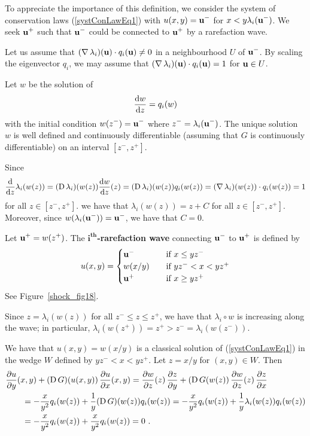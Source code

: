 \begin{egg}
To appreciate the importance of this definition,     \label{eggRareWaveN}
we consider the system of conservation laws
(\ref{systConLawEq1}) with $\displaystyle u(x,y) = \VEC{u}^-$
for $\displaystyle x < y \lambda_i(\VEC{u}^-)$.  We seek
$\displaystyle \VEC{u}^+$ such that $\displaystyle \VEC{u}^-$
could be connected to $\displaystyle \VEC{u}^+$ by
a rarefaction wave.

Let us assume that $(\graD \lambda_i)(\VEC{u}) \cdot q_i(\VEC{u}) \neq 0$
in a neighbourhood $U$ of $\displaystyle \VEC{u}^-$.  By scaling the
eigenvector $q_i$, we may assume that
$(\graD \lambda_i)(\VEC{u}) \cdot q_i(\VEC{u}) = 1$
for $\VEC{u} \in U$.

Let $w$ be the solution of
\[
\dydx{w}{z} = q_i(w)
\]
with the initial condition $\displaystyle w(z^-) = \VEC{u}^-$
where $\displaystyle z^- = \lambda_i(\VEC{u}^-)$.  The unique solution
$w$ is well defined and continuously differentiable (assuming that $G$
is continuously differentiable) on an interval $\displaystyle [z^-,z^+]$.

Since
\[
\dfdx{\lambda_i(w(z))}{z}  
= (\diff \lambda_i)(w(z)) \dydx{w}{z}(z)
= (\diff \lambda_i)(w(z)) q_i(w(z))
= (\graD \lambda_i)(w(z))\cdot q_i(w(z)) = 1
\]
for all $\displaystyle z \in [z^-,z^+]$. we have that
$\lambda_i(w(z)) = z + C$ for all $\displaystyle z \in [z^-,z^+]$.
Moreover, since $\displaystyle w(\lambda_i(\VEC{u}^-)) = \VEC{u}^-$,
we have that $C=0$.

Let $\displaystyle \VEC{u}^+ = w(z^+)$.
The {\bfseries $\displaystyle \mathbf{i^{th}}$-rarefaction
wave}
connecting $\displaystyle \VEC{u}^-$ to $\displaystyle \VEC{u}^+$
is defined by
\[
u(x,y) = \begin{cases}
\VEC{u}^- & \quad \text{if} \ x \leq y z^- \\
w(x/y) & \quad \text{if} \ y z^- < x < y z^+ \\
\VEC{u}^+ & \quad \text{if} \ x \geq y z^+
\end{cases}
\]
See Figure~\ref{shock_fig18}.

Since $z = \lambda_i(w(z))$ for all $\displaystyle z^- \leq z \leq z^+$,
we have that $\lambda_i\circ w$ is increasing along the wave; in
particular, $\displaystyle \lambda_i(w(z^+)) = z^+ > z^- = \lambda_i(w(z^-))$.

We have that $u(x,y) = w(x/y)$ is a classical solution of
(\ref{systConLawEq1}) in the wedge $W$ defined by
$\displaystyle y z^- < x < y z^+$.  Let $z = x/y$ for $(x,y) \in W$.  Then
\begin{align*}
&\pdydx{u}{y}(x,y) + (\diff G)(u(x,y)) \, \pdydx{u}{x}(x,y)
= \pdydx{w}{z}(z)\,\pdydx{z}{y} + (\diff G(w(z)) \, \pdydx{w}{z}(z)\,
\pdydx{z}{x} \\
&\qquad = -\frac{x}{y^2} q_i(w(z)) + \frac{1}{y} (\diff G)(w(z)) q_i(w(z))
= -\frac{x}{y^2} q_i(w(z)) + \frac{1}{y} \lambda_i(w(z)) q_i(w(z)) \\
&\qquad = -\frac{x}{y^2} q_i(w(z)) + \frac{x}{y^2} q_i(w(z))
= 0 \ .
\end{align*}
\end{egg}

